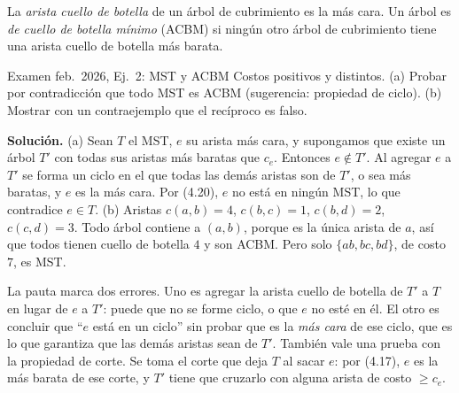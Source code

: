 La \emph{arista cuello de botella} de un árbol de cubrimiento es la más cara. Un árbol es \emph{de cuello de botella mínimo} (ACBM) si ningún otro árbol de cubrimiento tiene una arista cuello de botella más barata.

\begin{problema}{Examen feb.~2026, Ej.~2: MST y ACBM}
Costos positivos y distintos. (a) Probar por contradicción que todo MST es ACBM (sugerencia: propiedad de ciclo). (b) Mostrar con un contraejemplo que el recíproco es falso.

\smallskip
\textbf{Solución.} (a) Sean $T$ el MST, $e$ su arista más cara, y supongamos que existe un árbol $T'$ con todas sus aristas más baratas que $c_e$. Entonces $e\notin T'$. Al agregar $e$ a $T'$ se forma un ciclo en el que todas las demás aristas son de $T'$, o sea más baratas, y $e$ es la más cara. Por (4.20), $e$ no está en ningún MST, lo que contradice $e\in T$. (b) Aristas $c(a,b)=4$, $c(b,c)=1$, $c(b,d)=2$, $c(c,d)=3$. Todo árbol contiene a $(a,b)$, porque es la única arista de $a$, así que todos tienen cuello de botella $4$ y son ACBM. Pero solo $\{ab,bc,bd\}$, de costo $7$, es MST.
\end{problema}

\begin{center}
\end{center}

La pauta marca dos errores. Uno es agregar la arista cuello de botella de $T'$ a $T$ en lugar de $e$ a $T'$: puede que no se forme ciclo, o que $e$ no esté en él. El otro es concluir que ``$e$ está en un ciclo'' sin probar que es la \emph{más cara} de ese ciclo, que es lo que garantiza que las demás aristas sean de $T'$. También vale una prueba con la propiedad de corte. Se toma el corte que deja $T$ al sacar $e$: por (4.17), $e$ es la más barata de ese corte, y $T'$ tiene que cruzarlo con alguna arista de costo $\ge c_e$.

